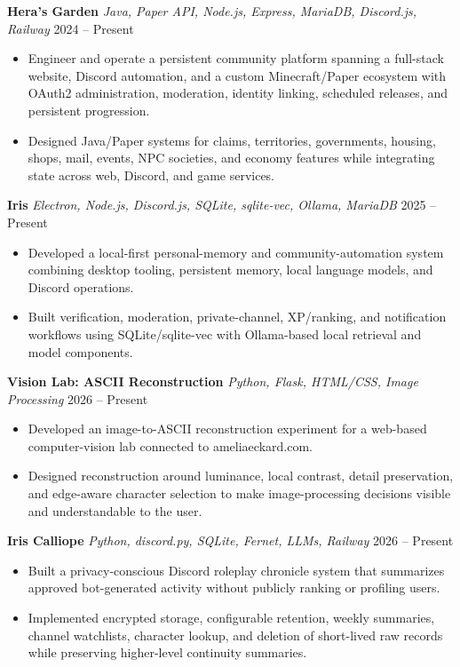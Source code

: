 \documentclass[letterpaper,10pt]{article}
\newcommand{\projectentry}[3]{
  \noindent\textbf{#1} \textbar{} \textit{#2} \hfill #3
}
\begin{document}
\smallskip

\projectentry
  {Hera's Garden}
  {Java, Paper API, Node.js, Express, MariaDB, Discord.js, Railway}
  {2024 -- Present}
\begin{itemize}
  \item Engineer and operate a persistent community platform spanning a full-stack website, Discord automation, and a custom Minecraft/Paper ecosystem with OAuth2 administration, moderation, identity linking, scheduled releases, and persistent progression.
  \item Designed Java/Paper systems for claims, territories, governments, housing, shops, mail, events, NPC societies, and economy features while integrating state across web, Discord, and game services.
\end{itemize}

\smallskip

\projectentry
  {Iris}
  {Electron, Node.js, Discord.js, SQLite, sqlite-vec, Ollama, MariaDB}
  {2025 -- Present}
\begin{itemize}
  \item Developed a local-first personal-memory and community-automation system combining desktop tooling, persistent memory, local language models, and Discord operations.
  \item Built verification, moderation, private-channel, XP/ranking, and notification workflows using SQLite/sqlite-vec with Ollama-based local retrieval and model components.
\end{itemize}

\smallskip

\projectentry
  {Vision Lab: ASCII Reconstruction}
  {Python, Flask, HTML/CSS, Image Processing}
  {2026 -- Present}
\begin{itemize}
  \item Developed an image-to-ASCII reconstruction experiment for a web-based computer-vision lab connected to ameliaeckard.com.
  \item Designed reconstruction around luminance, local contrast, detail preservation, and edge-aware character selection to make image-processing decisions visible and understandable to the user.
\end{itemize}

\smallskip

\projectentry
  {Iris Calliope}
  {Python, discord.py, SQLite, Fernet, LLMs, Railway}
  {2026 -- Present}
\begin{itemize}
  \item Built a privacy-conscious Discord roleplay chronicle system that summarizes approved bot-generated activity without publicly ranking or profiling users.
  \item Implemented encrypted storage, configurable retention, weekly summaries, channel watchlists, character lookup, and deletion of short-lived raw records while preserving higher-level continuity summaries.
\end{itemize}
\end{document}

